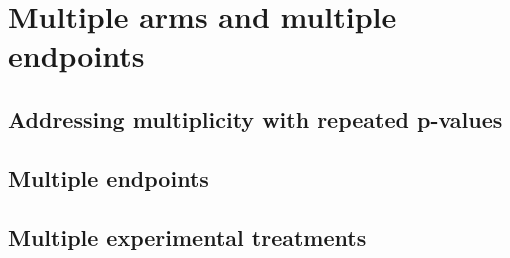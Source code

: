 \section{Multiple arms and multiple endpoints}
\subsection{Addressing multiplicity with repeated p-values}
\subsection{Multiple endpoints}
\subsection{Multiple experimental treatments}

